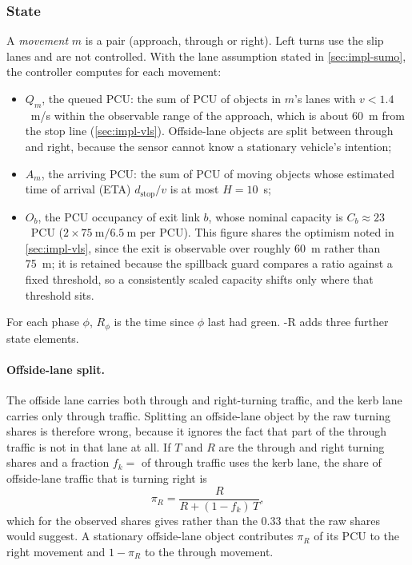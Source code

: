 \subsubsection{State}

A \emph{movement} $m$ is a pair (approach, through or right). Left turns use the slip lanes and are
not controlled. With the lane assumption stated in \cref{sec:impl-sumo}, the controller computes for
each movement:
\begin{itemize}[noitemsep]
  \item $Q_m$, the queued PCU: the sum of PCU of objects in $m$'s lanes with $v < 1.4$~m/s within the
        observable range of the approach, which is about 60~m from the stop line (\cref{sec:impl-vls}).
        Offside-lane objects are split between through and right, because the sensor cannot know a stationary
        vehicle's intention;
  \item $A_m$, the arriving PCU: the sum of PCU of moving objects whose estimated time of
        arrival (ETA) $d_{\text{stop}}/v$ is at most $H = 10$~s;
  \item $O_b$, the PCU occupancy of exit link $b$, whose nominal capacity is $C_b \approx 23$~PCU
        ($2 \times 75~\text{m} / 6.5~\text{m}$ per PCU). This figure shares the optimism noted in
        \cref{sec:impl-vls}, since the exit is observable over roughly 60~m rather than 75~m; it is retained
        because the spillback guard compares a ratio against a fixed threshold, so a consistently scaled
        capacity shifts only where that threshold sits.
\end{itemize}
For each phase $\phi$, $R_\phi$ is the time since $\phi$ last had green. \prism{}-R adds three further state
elements.

\paragraph{Offside-lane split.} The offside lane carries both through and right-turning traffic, and the
kerb lane carries only through traffic. Splitting an offside-lane object by the raw turning shares is
therefore wrong, because it ignores the fact that part of the through traffic is not in that lane at all. If
$T$ and $R$ are the through and right turning shares and a fraction $f_k = $  of through traffic uses
the kerb lane, the share of offside-lane traffic that is turning right is
\begin{equation}
  \pi_R = \frac{R}{R + (1 - f_k)\,T},
  \label{eq:impl-offside}
\end{equation}
which for the observed shares gives  rather than the 0.33 that the raw shares would suggest. A
stationary offside-lane object contributes $\pi_R$ of its PCU to the right movement and $1-\pi_R$ to the
through movement.

